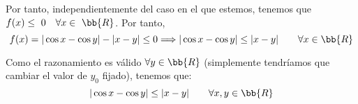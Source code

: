 \documentclass[12pt]{article}
\begin{document}
\begin{ejercicio}
\begin{itemize}
    Por tanto, independientemente del caso en el que estemos, tenemos que $f(x)\leq~0\quad \forall x\in~\bb{R}$. Por tanto,
    \begin{equation*}
        f(x)=|\cos x -\cos y|-|x-y|\leq 0 \Longrightarrow  |\cos x -\cos y|\leq |x-y| \qquad \forall x\in \bb{R}
    \end{equation*}
    
    Como el razonamiento es válido $\forall y\in \bb{R}$ (simplemente tendríamos que cambiar el valor de $y_0$ fijado), tenemos que:
    \begin{equation*}
        |\cos x -\cos y|\leq |x-y| \qquad \forall x,y\in \bb{R}
    \end{equation*}
\end{itemize}



\end{ejercicio}
\end{document}

